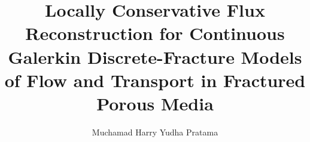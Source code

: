 \documentclass[a4paper,fleqn]{cas-sc}
\begin{document}
\let\WriteBookmarks\relax
\def\floatpagepagefraction{1}
\def\textpagefraction{.001}


\title[mode=title]{Locally Conservative Flux Reconstruction for Continuous Galerkin Discrete-Fracture Models of Flow and Transport in Fractured Porous Media}

\author[1]{Muchamad Harry Yudha Pratama}
\cormark[1]
\ead{}
\credit{}



\end{document}
